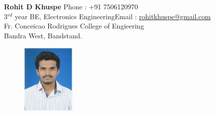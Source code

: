 \documentclass[a4paper]{article}
\begin{document}
	\begin{flushleft}
		\textbf{Rohit D Khuspe} \hfill{Phone : +91 7506120970}\\
		3$^{rd}$ year BE, Electronics Engineering\hfill{Email : \underline{rohitkhuspe@gmail.com}}\\
		Fr. Conceicao Rodrigues College of Engieering\\
		Bandra West, Bandstand.\\ %
		
			
	\end{flushleft}
		\begin{figure}[h]
			\begin{flushright}
				\vspace{-0.5in}
				\includegraphics[width=100px]{khuspe.png}
			\end{flushright}
		\end{figure}
	
\end{document}
